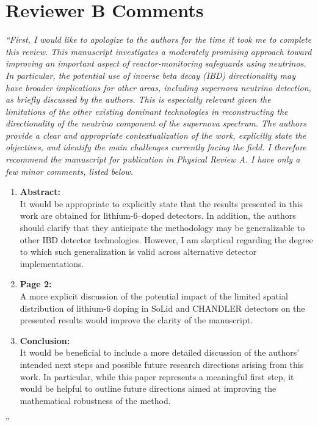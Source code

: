 \section{Reviewer B Comments}

{\it
``First, I would like to apologize to the authors for the time it took me to complete this review.
This manuscript investigates a moderately promising approach toward improving an important
aspect of reactor-monitoring safeguards using neutrinos. In particular, the potential use of inverse
beta decay (IBD) directionality may have broader implications for other areas, including
supernova neutrino detection, as briefly discussed by the authors. This is especially relevant
given the limitations of the other existing dominant technologies in reconstructing the
directionality of the neutrino component of the supernova spectrum. The authors provide a clear
and appropriate contextualization of the work, explicitly state the objectives, and identify the
main challenges currently facing the field. I therefore recommend the manuscript for publication
in Physical Review A.
I have only a few minor comments, listed below.

\begin{enumerate}
    \item {\bf Abstract:} \\It would be appropriate to explicitly state that the results presented in this work are obtained for lithium-6–doped detectors. In addition, the authors should clarify that they anticipate the methodology may be generalizable to other IBD detector technologies. However, I am skeptical regarding the degree to which such generalization is valid across alternative detector implementations.
    \item  {\bf Page 2:} \\A more explicit discussion of the potential impact of the limited spatial distribution of lithium-6 doping in SoLid and CHANDLER detectors on the presented results would improve the clarity of the manuscript.
    \item  {\bf Conclusion:} \\It would be beneficial to include a more detailed discussion of the authors’ intended next steps and possible future research directions arising from this work. In particular, while this paper represents a meaningful first step, it would be helpful to outline future directions aimed at improving the mathematical robustness of the method.
\end{enumerate}
''
}

